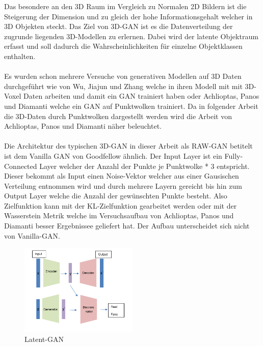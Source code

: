 \documentclass{llncs}
\begin{document}
Das besondere an den 3D Raum im Vergleich zu Normalen 2D Bildern ist die Steigerung der Dimension und zu gleich der hohe Informationsgehalt welcher in 3D Objekten steckt. Das Ziel von 3D-GAN ist es die Datenverteilung der zugrunde liegenden 3D-Modellen zu erlernen. Dabei wird der latente Objektraum erfasst und soll dadurch die Wahrscheinlichkeiten für einzelne Objektklassen enthalten. 
\\\\
Es wurden schon mehrere Versuche von generativen Modellen auf 3D Daten durchgeführt wie von Wu, Jiajun und Zhang \cite{3d} welche in ihren Modell mit mit 3D-Voxel Daten arbeiten und damit ein GAN trainiert haben oder Achlioptas, Panos und Diamanti\cite{3dgan} welche ein GAN auf Punktwolken trainiert. Da in folgender Arbeit die 3D-Daten durch Punktwolken dargestellt werden wird die Arbeit von Achlioptas, Panos und Diamanti näher beleuchtet.
\\\\
Die Architektur des typischen 3D-GAN in dieser Arbeit als RAW-GAN betitelt ist dem Vanilla GAN von Goodfellow ähnlich. Der Input Layer ist ein Fully-Connected Layer welcher der Anzahl der Punkte je Punktwolke * 3 entspricht. Dieser bekommt als Input einen Noise-Vektor welcher aus einer Gausischen Verteilung entnommen wird und durch mehrere Layern gereicht bis hin zum Output Layer welche die Anzahl der gewünschten Punkte besteht. Also Zielfunktion kann mit der KL-Zielfunktion gearbeitet werden oder mit der Wasserstein Metrik welche im Versuchsaufbau von Achlioptas, Panos und Diamanti besser Ergebnissee geliefert hat. Der Aufbau unterscheidet sich nicht von Vanilla-GAN\cite{3dgan}. 

\begin{figure}[htbp] 
	\centering
	\includegraphics[width=0.5\textwidth]{latentgan.png}
	\caption{Latent-GAN}
	\label{fig:Bild39}
\end{figure}
\end{document}
